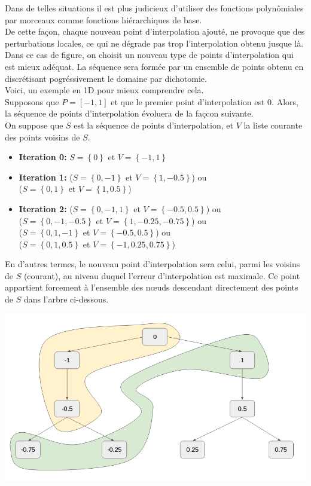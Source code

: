 \hspace{0.5cm}Dans de telles situations il est plus judicieux d'utiliser des fonctions polynômiales par morceaux comme fonctions hiérarchiques de base.\\
De cette façon, chaque nouveau point d'interpolation ajouté, ne provoque que des perturbations locales, ce qui ne dégrade pas trop l'interpolation obtenu jusque là.\\
Dans ce cas de figure, on choisit un nouveau type de points d'interpolation qui est mieux adéquat. La séquence sera formée par un ensemble de points obtenu en discrétisant pogréssivement
le domaine par dichotomie.\\
Voici, un exemple en 1D pour mieux comprendre cela.\\
Supposons que $P = \left [ -1, 1 \right ]$ et que le premier point d'interpolation est $0$. Alors, la séquence de points d'interpolation évoluera
de la façcon suivante.\\
On suppose que $S$ est la séquence de points d'interpolation, et $V$ la liste courante des points voisins de $S$.
\begin{itemize}
\item \textbf{Iteration 0:} $S = \left \{ 0 \right \}$ et $V = \left \{ -1,1 \right \}$
\item \textbf{Iteration 1:} ($S = \left \{ 0, -1 \right \}$ et $V = \left \{ 1, -0.5 \right \}$) ou \\
($S = \left \{ 0, 1 \right \}$ et $V = \left \{ 1, 0.5 \right \}$)
\item \textbf{Iteration 2:} ($S = \left \{ 0, -1, 1\right \}$ et $V = \left \{ -0.5, 0.5 \right \}$) ou \\
($S = \left \{ 0, -1, -0.5 \right \}$ et $V = \left \{ 1, -0.25, -0.75\right \}$) ou \\
($S = \left \{ 0, 1, -1 \right \}$ et $V = \left \{ -0.5, 0.5\right \}$) ou \\
($S = \left \{ 0, 1, 0.5 \right \}$ et $V = \left \{ -1, 0.25, 0.75\right \}$)
\end{itemize}
En d'autres termes, le nouveau point d'interpolation sera celui, parmi les voisins de $S$ (courant), au niveau duquel l'erreur d'interpolation est maximale.
Ce point appartient forcement à l'ensemble des nœuds descendant directement des points de $S$ dans l'arbre ci-dessous.
\begin{center}
\includegraphics[height= 6 cm,width = 9 cm]{images/tree.png}
\end{center}
